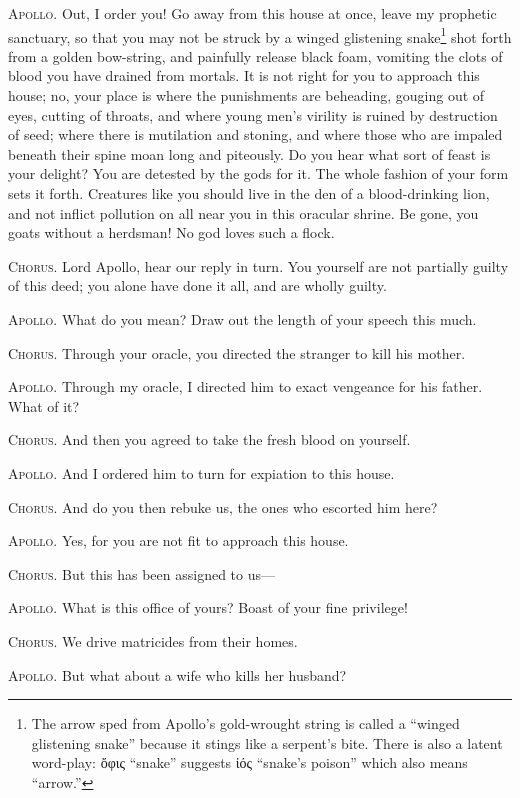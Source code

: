 \documentclass[12pt]{article}
\begin{document}
\textsc{Apollo.} Out, I order you! Go away from this house at once, leave my prophetic sanctuary, so that you may not be struck by a winged glistening snake\footnote{The arrow sped from Apollo's gold-wrought string is called a ``winged glistening snake'' because it stings like a serpent's bite. There is also a latent word-play: ὄφις ``snake'' suggests ἰός ``snake's poison'' which also means ``arrow.''} shot forth from a golden bow-string, and painfully release black foam, vomiting the clots of blood you have drained from mortals. It is not right for you to approach this house; no, your place is where the punishments are beheading, gouging out of eyes, cutting of throats, and where young men's virility is ruined by destruction of seed; where there is mutilation and stoning, and where those who are impaled beneath their spine moan long and piteously. Do you hear what sort of feast is your delight? You are detested by the gods for it. The whole fashion of your form sets it forth. Creatures like you should live in the den of a blood-drinking lion, and not inflict pollution on all near you in this oracular shrine. Be gone, you goats without a herdsman! No god loves such a flock.

\textsc{Chorus.} Lord Apollo, hear our reply in turn. You yourself are not partially guilty of this deed; you alone have done it all, and are wholly guilty.

\textsc{Apollo.} What do you mean? Draw out the length of your speech this much.

\textsc{Chorus.} Through your oracle, you directed the stranger to kill his mother.

\textsc{Apollo.} Through my oracle, I directed him to exact vengeance for his father. What of it?

\textsc{Chorus.} And then you agreed to take the fresh blood on yourself.

\textsc{Apollo.} And I ordered him to turn for expiation to this house.

\textsc{Chorus.} And do you then rebuke us, the ones who escorted him here?

\textsc{Apollo.} Yes, for you are not fit to approach this house.

\textsc{Chorus.} But this has been assigned to us---

\textsc{Apollo.} What is this office of yours? Boast of your fine privilege!

\textsc{Chorus.} We drive matricides from their homes.

\textsc{Apollo.} But what about a wife who kills her husband?
\end{document}
